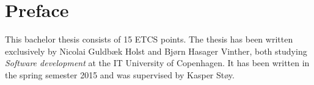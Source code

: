 \section*{Preface}
This bachelor thesis consists of 15 ETCS points.
The thesis has been written exclusively by Nicolai Guldbæk Holst and Bjørn Hasager Vinther, both studying \textit{Software development} at the IT University of Copenhagen.  It has been written in the spring semester 2015 and was supervised by Kasper Støy. 